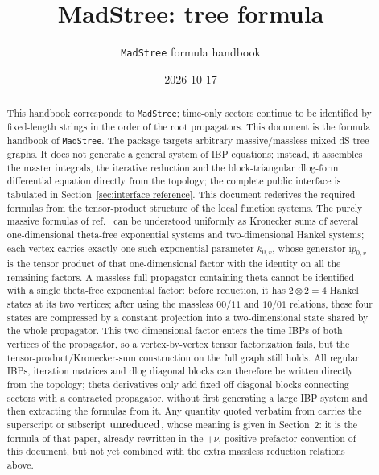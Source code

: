\documentclass[11pt,a4paper]{article}
\title{MadStree: tree formula}
\author{\texttt{MadStree} formula handbook}
\date{2026-10-17}
\newcommand{\ii}{\mathrm i}
\begin{document}
\maketitle

\begin{abstract}
This handbook corresponds to \texttt{MadStree}; time-only sectors continue to be identified by fixed-length strings in the order of the root propagators.
This document is the formula handbook of \texttt{MadStree}. The package targets arbitrary massive/massless mixed dS tree graphs. It does not generate a general system of IBP equations; instead, it assembles the master integrals, the iterative reduction and the block-triangular dlog-form differential equation directly from the topology; the complete public interface is tabulated in Section~\ref{sec:interface-reference}. This document rederives the required formulas from the tensor-product structure of the local function systems. The purely massive formulas of ref.~\cite{Chen:2023eic} can be understood uniformly as Kronecker sums of several one-dimensional theta-free exponential systems and two-dimensional Hankel systems; each vertex carries exactly one such exponential parameter $k_{0,v}$, whose generator $\ii p_{0,v}$ is the tensor product of that one-dimensional factor with the identity on all the remaining factors. A massless full propagator containing theta cannot be identified with a single theta-free exponential factor: before reduction, it has $2\otimes2=4$ Hankel states at its two vertices; after using the massless $00/11$ and $10/01$ relations, these four states are compressed by a constant projection into a two-dimensional state shared by the whole propagator. This two-dimensional factor enters the time-IBPs of both vertices of the propagator, so a vertex-by-vertex tensor factorization fails, but the tensor-product/Kronecker-sum construction on the full graph still holds. All regular IBPs, iteration matrices and dlog diagonal blocks can therefore be written directly from the topology; theta derivatives only add fixed off-diagonal blocks connecting sectors with a contracted propagator, without first generating a large IBP system and then extracting the formulas from it. Any quantity quoted verbatim from \cite{Chen:2023eic} carries the superscript or subscript ${\rm unreduced}$, whose meaning is given in Section~2: it is the formula of that paper, already rewritten in the $+\nu$, positive-prefactor convention of this document, but not yet combined with the extra massless reduction relations above.
\end{abstract}
\end{document}
